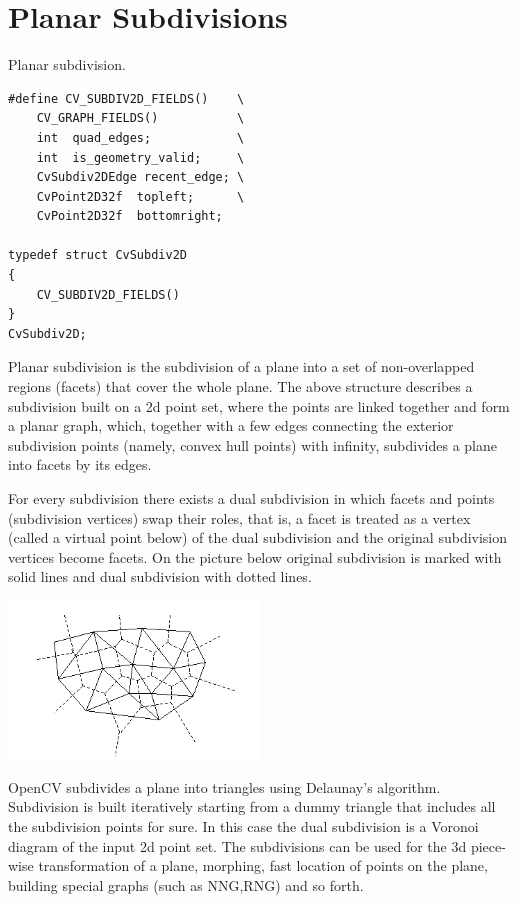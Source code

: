 \ifCPy

\section{Planar Subdivisions}

\label{CvSubdiv2D}

Planar subdivision.

\begin{lstlisting}
#define CV_SUBDIV2D_FIELDS()    \
    CV_GRAPH_FIELDS()           \
    int  quad_edges;            \
    int  is_geometry_valid;     \
    CvSubdiv2DEdge recent_edge; \
    CvPoint2D32f  topleft;      \
    CvPoint2D32f  bottomright;

typedef struct CvSubdiv2D
{
    CV_SUBDIV2D_FIELDS()
}
CvSubdiv2D;
\end{lstlisting}

Planar subdivision is the subdivision of a plane into a set of
non-overlapped regions (facets) that cover the whole plane. The above
structure describes a subdivision built on a 2d point set, where the points
are linked together and form a planar graph, which, together with a few
edges connecting the exterior subdivision points (namely, convex hull points)
with infinity, subdivides a plane into facets by its edges.

For every subdivision there exists a dual subdivision in which facets and
points (subdivision vertices) swap their roles, that is, a facet is
treated as a vertex (called a virtual point below) of the dual subdivision and
the original subdivision vertices become facets. On the picture below
original subdivision is marked with solid lines and dual subdivision
with dotted lines.

\includegraphics[width=0.5\textwidth]{pics/subdiv.png}

OpenCV subdivides a plane into triangles using Delaunay's
algorithm. Subdivision is built iteratively starting from a dummy
triangle that includes all the subdivision points for sure. In this
case the dual subdivision is a Voronoi diagram of the input 2d point set. The
subdivisions can be used for the 3d piece-wise transformation of a plane,
morphing, fast location of points on the plane, building special graphs
(such as NNG,RNG) and so forth.

